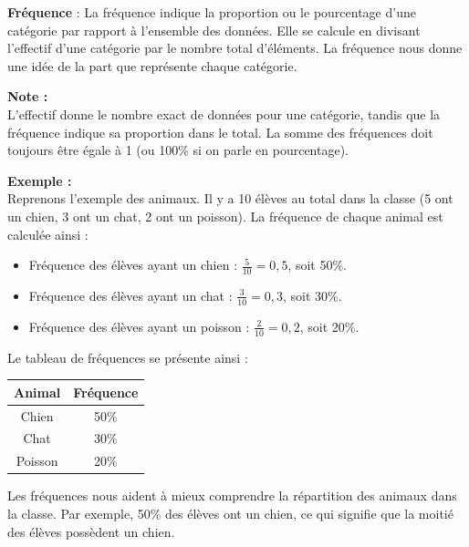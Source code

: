\documentclass{article}
\begin{document}
\begin{tcolorbox}
\textbf{Fréquence} : La fréquence indique la proportion ou le pourcentage d'une catégorie par rapport à l'ensemble des données. Elle se calcule en divisant l'effectif d'une catégorie par le nombre total d'éléments. La fréquence nous donne une idée de la part que représente chaque catégorie.
\end{tcolorbox}

\vspace{0.15cm}

\begin{tcolorbox}
\textbf{Note :} \\
L'effectif donne le nombre exact de données pour une catégorie, tandis que la fréquence indique sa proportion dans le total. La somme des fréquences doit toujours être égale à 1 (ou 100\% si on parle en pourcentage).
\end{tcolorbox}

\begin{tcolorbox}
\textbf{Exemple :} \\  
Reprenons l'exemple des animaux. Il y a 10 élèves au total dans la classe (5 ont un chien, 3 ont un chat, 2 ont un poisson). La fréquence de chaque animal est calculée ainsi :

\begin{itemize}
    \item Fréquence des élèves ayant un chien : \( \frac{5}{10} = 0,5 \), soit 50\%.
    \item Fréquence des élèves ayant un chat : \( \frac{3}{10} = 0,3 \), soit 30\%.
    \item Fréquence des élèves ayant un poisson : \( \frac{2}{10} = 0,2 \), soit 20\%.
\end{itemize}

Le tableau de fréquences se présente ainsi :

\begin{center}
\begin{tabular}{|c|c|}
\hline
Animal & Fréquence \\
\hline
Chien & 50\% \\
Chat & 30\% \\
Poisson & 20\% \\
\hline
\end{tabular}
\end{center}

Les fréquences nous aident à mieux comprendre la répartition des animaux dans la classe. Par exemple, 50\% des élèves ont un chien, ce qui signifie que la moitié des élèves possèdent un chien.
\end{tcolorbox}
\end{document}
